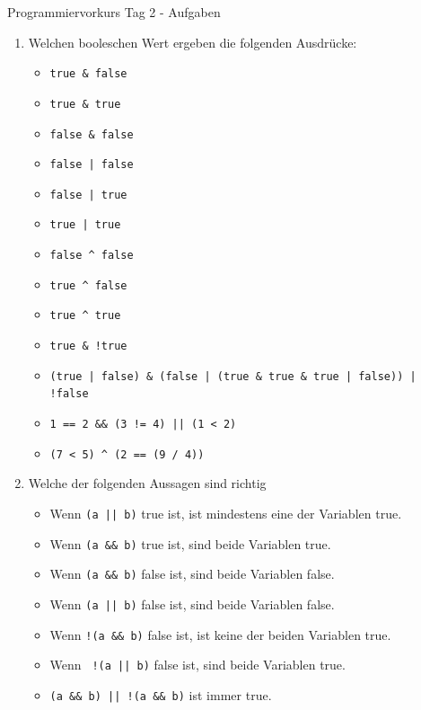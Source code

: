 \documentclass[final,a4paper]{article}
\begin{document}
\lstset{tabsize=4}
\lstset{basicstyle=\small}
\lstset{language=java}

{\huge Programmiervorkurs Tag 2 - Aufgaben}

\bigskip

\begin{enumerate}
\item{
	Welchen booleschen Wert ergeben die folgenden Ausdrücke:
	\begin{itemize}
		\item \lstinline{true & false}
		\item \lstinline{true & true}
		\item \lstinline{false & false}
		\item \lstinline{false | false}
		\item \lstinline{false | true}
		\item \lstinline{true | true}
		\item \lstinline{false ^ false}
		\item \lstinline{true ^ false}
		\item \lstinline{true ^ true}
		\item \lstinline{true & !true}
		\item \lstinline{(true | false) & (false | (true & true & true | false)) | !false}
		\item \lstinline{1 == 2 && (3 != 4) || (1 < 2)}
		\item \lstinline{(7 < 5) ^ (2 == (9 / 4))}
	\end{itemize}
}

\item{
Welche der folgenden Aussagen sind richtig
\begin{itemize}
\item Wenn \lstinline{(a || b)} true ist, ist mindestens eine der Variablen true.
\item Wenn \lstinline{(a && b)} true ist, sind beide Variablen true.
\item Wenn \lstinline{(a && b)} false ist, sind beide Variablen false.
\item Wenn \lstinline{(a || b)} false ist, sind beide Variablen false.
\item Wenn \lstinline{!(a && b)} false ist, ist keine der beiden Variablen true.
\item Wenn \lstinline{ !(a || b)} false ist, sind beide Variablen true.
\item \lstinline{(a && b) || !(a && b)} ist immer true.
\end{itemize}
}


\end{enumerate}
\end{document}
